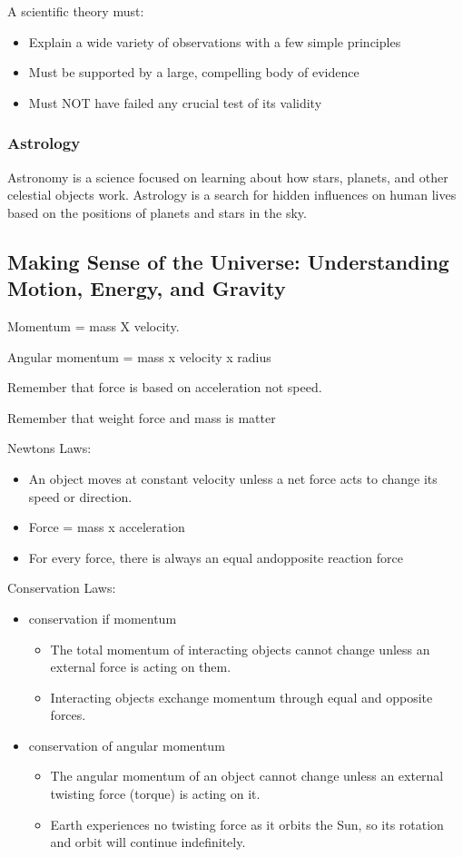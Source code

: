 \documentclass[12pt]{article}
\begin{document}
A scientific theory must:
\begin{itemize}
    \item Explain a wide variety of observations with a few simple principles
    \item Must be supported by a large, compelling body of evidence
    \item Must NOT have failed any crucial test of its validity
\end{itemize}

\subsubsection{Astrology}
 Astronomy is a science focused on learning about how stars, planets, and other celestial  objects work. Astrology is a search for hidden influences on  human lives based on the positions of planets  and stars in the sky.

\subsection{Making Sense of the Universe: Understanding Motion, Energy, and Gravity}
Momentum = mass X velocity.

Angular momentum = mass x velocity x radius

Remember that force is based on acceleration not speed.

Remember that weight force and mass is matter

Newtons Laws:
\begin{itemize}
    \item An object moves at constant velocity unless a net force acts to change its speed or direction.
    \item Force = mass x acceleration
    \item For every force, there is always an equal andopposite reaction force
\end{itemize}

Conservation Laws:
\begin{itemize}
    \item conservation if momentum
    \begin{itemize}
        \item The total momentum of interacting objects cannot change unless an external force is acting on them.
        \item Interacting objects exchange momentum through equal and opposite forces.
    \end{itemize}
    \item conservation of angular momentum
    \begin{itemize}
        \item The angular momentum of an object cannot change unless an external twisting force (torque) is acting on it.
        \item Earth experiences no twisting force as it orbits the Sun, so its rotation and orbit will continue indefinitely.
    \end{itemize}
\end{itemize}
\end{document}
